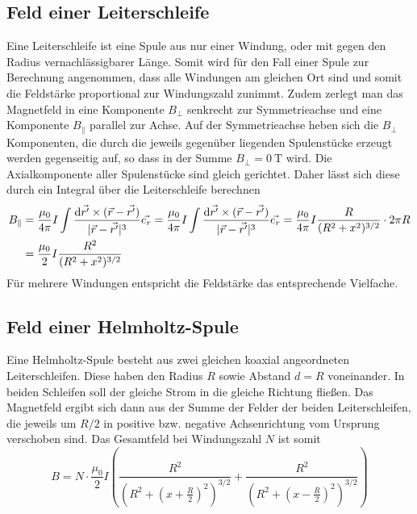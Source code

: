 \subsection{Feld einer Leiterschleife}
Eine Leiterschleife ist eine Spule aus nur einer Windung, oder mit gegen den Radius vernachlässigbarer Länge. Somit wird für den Fall einer Spule zur Berechnung angenommen, dass alle Windungen am gleichen Ort sind und somit die Feldstärke proportional zur Windungszahl zunimmt. Zudem zerlegt man das Magnetfeld in eine Komponente $ B_\perp $ senkrecht zur Symmetrieachse und eine Komponente $ B_\parallel $ parallel zur Achse. Auf der Symmetrieachse heben sich die $ B_\perp $ Komponenten, die durch die jeweils gegenüber liegenden Spulenstücke erzeugt werden gegenseitig auf, so dass in der Summe $ B_\perp = \SI{0}{\tesla} $ wird. Die Axialkomponente aller Spulenstücke sind gleich gerichtet. Daher lässt sich diese durch ein Integral über die Leiterschleife berechnen
\begin{align}
 	B_\parallel &= \frac{\mu_0}{4\pi} I \int \frac{\mathrm{d}\vec{r'}\times (\vec{r} - \vec{r'})}{|\vec{r} - \vec{r'}|^3} \vec{e_r} = \frac{\mu_0}{4\pi} I \int \frac{\mathrm{d}\vec{r'}\times (\vec{r} - \vec{r'})}{|\vec{r} - \vec{r'}|^3} \vec{e_r}
 	 = \frac{\mu_0}{4\pi} I \frac{R}{(R^2 + x^2)^{3/2}} \cdot 2\pi R \notag \\
 	&= \frac{\mu_0}{2}I \frac{R^2}{(R^2 + x^2)^{3/2}}
\end{align}
Für mehrere Windungen entspricht die Feldstärke das entsprechende Vielfache.

\subsection{Feld einer Helmholtz-Spule}
Eine Helmholtz-Spule besteht aus zwei gleichen koaxial angeordneten Leiterschleifen. Diese haben den Radius $ R $ sowie Abstand $ d = R $ voneinander. In beiden Schleifen soll der gleiche Strom in die gleiche Richtung fließen. Das Magnetfeld ergibt sich dann aus der Summe der Felder der beiden Leiterschleifen, die jeweils um $ R/2 $ in positive bzw. negative Achsenrichtung vom Ursprung verschoben sind. Das Gesamtfeld bei Windungszahl $ N $ ist somit
\begin{equation}
	B = N\cdot \frac{\mu_0}{2} I \left(\frac{R^2}{\left(R^2 + \left(x + \frac{R}{2}\right)^2\right)^{3/2}} + \frac{R^2}{\left(R^2 + \left(x - \frac{R}{2}\right)^2\right)^{3/2}}\right)
    \label{eq:helmholtz}
\end{equation}

